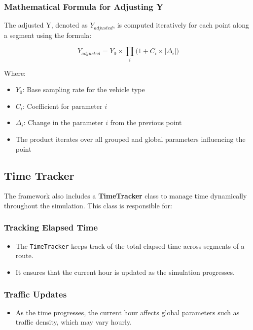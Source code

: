 \documentclass[sigplan,screen]{acmart}
\begin{document}
\subsubsection{Mathematical Formula for Adjusting Y}
The adjusted Y, denoted as $Y_{adjusted}$, is computed iteratively for each point along a segment using the formula:

\[
Y_{adjusted} = Y_0 \times \prod_{i} \big( 1 + C_i \times |\Delta_i| \big)
\]

Where:
\begin{itemize}
    \item $Y_0$: Base sampling rate for the vehicle type
    \item $C_i$: Coefficient for parameter $i$
    \item $\Delta_i$: Change in the parameter $i$ from the previous point
    \item The product iterates over all grouped and global parameters influencing the point
\end{itemize}

\subsection{Time Tracker}
The framework also includes a \textbf{TimeTracker} class to manage time dynamically throughout the simulation. This class is responsible for:

\subsubsection{Tracking Elapsed Time}
\begin{itemize}
    \item The \texttt{TimeTracker} keeps track of the total elapsed time across segments of a route.
    \item It ensures that the current hour is updated as the simulation progresses.
\end{itemize}

\subsubsection{Traffic Updates}
\begin{itemize}
    \item As the time progresses, the current hour affects global parameters such as traffic density, which may vary hourly.
\end{itemize}
\end{document}
